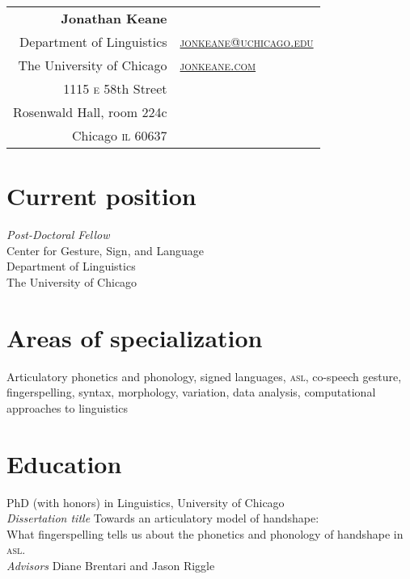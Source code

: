 \documentclass[10pt, letterpaper]{article}
\newcommand{\years}[1]{\marginpar{\scriptsize #1}}
\begin{document}
\thispagestyle{empty} %
\reversemarginpar
\raggedright

\begin{table}[!t]
  \begin{tabular*}{6.5in}{r|l}
    \hspace{3in}\textbf{\LARGE\sffamily Jonathan Keane}  &\\
Department of Linguistics & \href{mailto:jonkeane@uchicago.edu}{\textsc{jonkeane@uchicago.edu}}\\
  The University of Chicago & \href{http://jonkeane.com}{\textsc{jonkeane.com}}\\
1115 \textsc{e} 58th Street & \\
Rosenwald Hall, room 224c & \\
    Chicago \textsc{il} 60637 & \\
  \end{tabular*}
\end{table}
\setlength\parindent{0in}
\setlength\parskip{0ex}
\section*{Current position}
\emph{Post-Doctoral Fellow}\\ Center for Gesture, Sign, and Language\\ Department of Linguistics \\ The University of Chicago\\

\section*{Areas of specialization}
Articulatory phonetics and phonology, signed languages, \textsc{asl}, co-speech gesture, fingerspelling, syntax, morphology, variation, data analysis, computational approaches to linguistics


\section*{Education}
\-\years{2014}PhD (with honors) in Linguistics, University of Chicago \\
\hspace{2em} \textit{Dissertation title} Towards an articulatory model of handshape:\\
\hspace{4em}What fingerspelling tells us about the phonetics and phonology of handshape in \textsc{asl}.\\
\hspace{2em} \textit{Advisors} Diane Brentari and Jason Riggle
\end{document}
